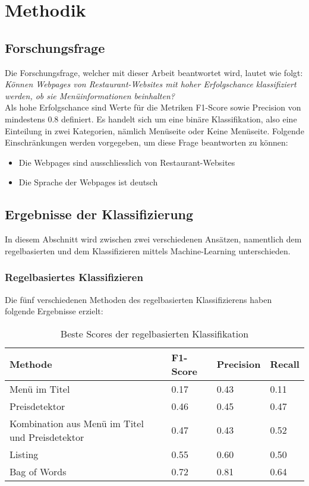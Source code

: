 \chapter{Methodik}
\section{Forschungsfrage}
Die Forschungsfrage, welcher mit dieser Arbeit beantwortet wird, lautet wie folgt:\\

\emph{Können Webpages von Restaurant-Websites mit hoher Erfolgschance klassifiziert werden, ob sie Menüinformationen beinhalten?}\\

Als hohe Erfolgschance sind Werte für die Metriken \glqq F1-Score\grqq{} sowie \glqq Precision\grqq{} von mindestens 0.8 definiert.
Es handelt sich um eine binäre Klassifikation, also eine Einteilung in zwei Kategorien, nämlich \glqq Menüseite\grqq{} oder \glqq Keine Menüseite\grqq.
Folgende Einschränkungen werden vorgegeben, um diese Frage beantworten zu können:
\begin{itemize}
	\item Die Webpages sind ausschliesslich von Restaurant-Websites
	\item Die Sprache der Webpages ist deutsch
\end{itemize}
\section{Ergebnisse der Klassifizierung}
In diesem Abschnitt wird zwischen zwei verschiedenen Ansätzen, namentlich dem regelbasierten und dem Klassifizieren mittels Machine-Learning unterschieden.
\subsection{Regelbasiertes Klassifizieren}
Die fünf verschiedenen Methoden des regelbasierten Klassifizierens haben folgende Ergebnisse erzielt:\\
\begin{table}
\caption{Beste Scores der regelbasierten Klassifikation}
\centering
\begin{tabular}{|l|l|l|l|}
	\hline
	Methode & F1-Score & Precision & Recall\\
	\hline
	Menü im Titel & 0.17 & 0.43 & 0.11 \\
	Preisdetektor & 0.46 & 0.45 & 0.47 \\
	Kombination aus Menü im Titel und Preisdetektor & 0.47 & 0.43 & 0.52\\
	Listing & 0.55 & 0.60 & 0.50\\
	Bag of Words & 0.72 & 0.81 & 0.64\\
	\hline
\end{tabular}
\end{table}

